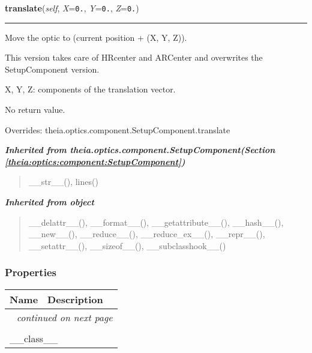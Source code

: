     \vspace{0.5ex}

\hspace{.8\funcindent}\begin{boxedminipage}{\funcwidth}

    \raggedright \textbf{translate}(\textit{self}, \textit{X}={\tt 0.}, \textit{Y}={\tt 0.}, \textit{Z}={\tt 0.})

    \vspace{-1.5ex}

    \rule{\textwidth}{0.5\fboxrule}
\setlength{\parskip}{2ex}
    Move the optic to (current position + (X, Y, Z)).

    This version takes care of HRcenter and ARCenter and overwrites the 
    SetupComponent version.

    X, Y, Z: components of the translation vector.

    No return value.

\setlength{\parskip}{1ex}
      Overrides: theia.optics.component.SetupComponent.translate

    \end{boxedminipage}


\large{\textbf{\textit{Inherited from theia.optics.component.SetupComponent\textit{(Section \ref{theia:optics:component:SetupComponent})}}}}

\begin{quote}
\_\_str\_\_(), lines()
\end{quote}

\large{\textbf{\textit{Inherited from object}}}

\begin{quote}
\_\_delattr\_\_(), \_\_format\_\_(), \_\_getattribute\_\_(), \_\_hash\_\_(), \_\_new\_\_(), \_\_reduce\_\_(), \_\_reduce\_ex\_\_(), \_\_repr\_\_(), \_\_setattr\_\_(), \_\_sizeof\_\_(), \_\_subclasshook\_\_()
\end{quote}


  \subsubsection{Properties}

    \vspace{-1cm}
\hspace{\varindent}\begin{longtable}{|p{\varnamewidth}|p{\vardescrwidth}|l}
\cline{1-2}
\cline{1-2} \centering \textbf{Name} & \centering \textbf{Description}& \\
\cline{1-2}
\endhead\cline{1-2}\multicolumn{3}{r}{\small\textit{continued on next page}}\\\endfoot\cline{1-2}
\endlastfoot\multicolumn{2}{|l|}{\textit{Inherited from object}}\\
\multicolumn{2}{|p{\varwidth}|}{\raggedright \_\_class\_\_}\\
\cline{1-2}
\end{longtable}


